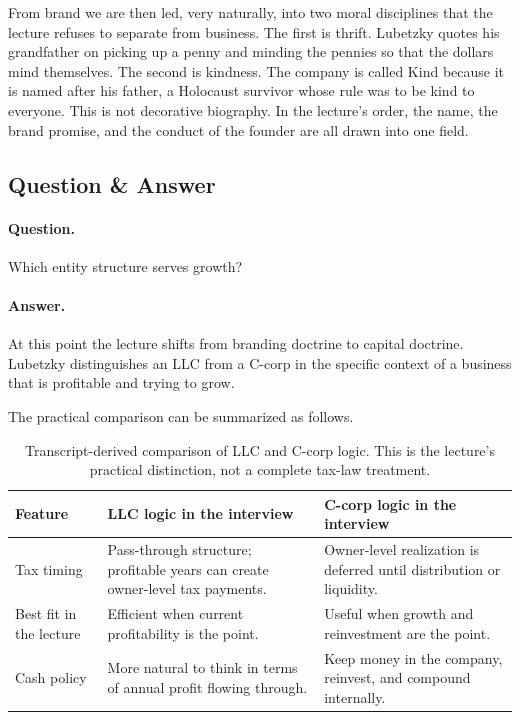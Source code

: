 From brand we are then led, very naturally, into two moral disciplines that the lecture refuses to separate from business. The first is thrift. Lubetzky quotes his grandfather on picking up a penny and minding the pennies so that the dollars mind themselves. The second is kindness. The company is called Kind because it is named after his father, a Holocaust survivor whose rule was to be kind to everyone. This is not decorative biography. In the lecture's order, the name, the brand promise, and the conduct of the founder are all drawn into one field.

\subsection{Question \& Answer}

\paragraph{Question.} Which entity structure serves growth?

\paragraph{Answer.} At this point the lecture shifts from branding doctrine to capital doctrine. Lubetzky distinguishes an LLC from a C-corp in the specific context of a business that is profitable and trying to grow.

The practical comparison can be summarized as follows.

\begin{table}[h]
\centering
\begin{tabular}{|p{}|p{}|p{}|}
\hline
\textbf{Feature} & \textbf{LLC logic in the interview} & \textbf{C-corp logic in the interview} \\
\hline
Tax timing & Pass-through structure; profitable years can create owner-level tax payments. & Owner-level realization is deferred until distribution or liquidity. \\
\hline
Best fit in the lecture & Efficient when current profitability is the point. & Useful when growth and reinvestment are the point. \\
\hline
Cash policy & More natural to think in terms of annual profit flowing through. & Keep money in the company, reinvest, and compound internally. \\
\hline
\end{tabular}
\caption{Transcript-derived comparison of LLC and C-corp logic. This is the lecture's practical distinction, not a complete tax-law treatment.}
\end{table}

